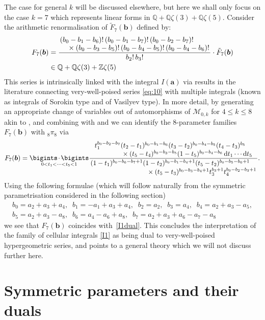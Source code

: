 \documentclass[12pt,reqno]{amsart}
\theoremstyle{remark}
\renewcommand{\d}{{\mathrm d}}
\newcommand\ba{\boldsymbol a}
\newcommand\bb{\boldsymbol b}
\begin{document}
The  case for general $k$ will be discussed elsewhere, but here we shall only focus on the case $k=7$  which represents linear forms in $\mathbb Q+\mathbb Q\zeta(3)+\mathbb Q\zeta(5)$. 
Consider  the  arithmetic renormalisation of $\tilde F_7(\bb)$ defined by:
\begin{align}
F_7(\bb)
&=\frac{\splitfrac{(b_0-b_1-b_6)!\,(b_0-b_1-b_7)!\,(b_0-b_2-b_7)!}
{\times(b_0-b_3-b_5)!\,(b_0-b_4-b_5)!\,(b_0-b_4-b_6)!}}{b_2!\,b_3!}
\cdot\tilde F_7(\bb)
\label{eq-nm}
\\
&\in\mathbb Q+\mathbb Q\zeta(3)+\mathbb Z\zeta(5)
\nonumber
\end{align}
This series is intrinsically linked with the integral $I(\ba)$ via   results in the literature connecting very-well-poised series \eqref{eq:10} with multiple integrals (known as integrals of Sorokin type and of Vasilyev type). In more detail, 
by generating  an appropriate change of variables 
out of automorphisms of $\mathcal{M}_{0,k}$ for $4\leq k \leq 8$ akin to \cite[proof of Proposition~7.2]{Br16}, and combining with \cite[Theorem~2]{Zl02} and \cite[Theorem~5]{Zu03} we can identify the 8-parameter families $F_7(\bb)$ with  $_8\pi_8$ via
\[
F_7(\bb)
=\raisebox{0.1mm}{$\displaystyle\mathop{\bigints\!\!\!\dotsb\!\!\!\bigints}_{0<t_1<\dots<t_5<1}$}
\frac{\splitfrac{t_1^{b_0-b_2-b_7}(t_2-t_1)^{b_0-b_1-b_6}(t_3-t_2)^{b_0-b_4-b_5}(t_4-t_3)^{b_5}}
{\times(t_5-t_4)^{b_0-b_3-b_5}(1-t_5)^{b_0-b_4-b_6}\,\d t_1\dotsb\d t_5}}
{\splitfrac{(1-t_1)^{b_0-b_6-b_7+1}(1-t_2)^{b_0-b_1-b_4+1}(t_5-t_2)^{b_0-b_5-b_6+1}}
{\times(t_5-t_3)^{b_0-b_3-b_4+1}t_3^{b_3+1}t_4^{b_0-b_2-b_3+1}}}.
\]
Using the following formulae (which will follow naturally from the symmetric parametrisation considered in the following section) 
\begin{gather*}
b_0=a_2+a_3+a_4, \;\; b_1=-a_1+a_3+a_4, \;\; b_2=a_2, \;\; b_3=a_4, \;\; b_4=a_2+a_3-a_5, \\ b_5=a_2+a_3-a_8, \;\; b_6=a_4-a_6+a_8, \;\; b_7=a_2+a_3+a_6-a_7-a_8
\end{gather*}
we see that $F_7(\bb)$ coincides with~\eqref{I1dual}. This concludes the interpretation of the family of cellular integrals \eqref{I1} as being dual to very-well-poised hypergeometric series, and points to a general theory which we will not discuss further here. 








\section{Symmetric parameters and their duals}
\label{sym-param}
\end{document}
